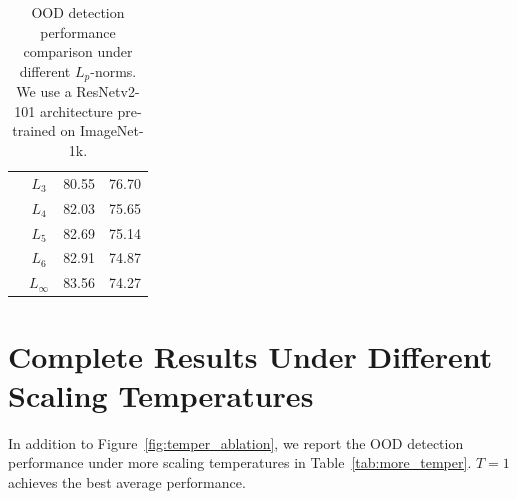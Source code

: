 \documentclass{article}
\begin{document}
\begin{table}[t]
\begin{tabular}{c|c|cc}
                                       & $L_{3}$                             & 80.55                & 76.70                \\
                                       & $L_{4}$                             & 82.03                & 75.65                \\
                                       & $L_{5}$                             & 82.69                & 75.14                \\
                                       & $L_{6}$                             & 82.91                & 74.87                \\
                                       & $L_{\infty}$                           & 83.56                & 74.27                \\ \bottomrule
\end{tabular}
    \caption{OOD detection performance comparison under different $L_p$-norms. We use a ResNetv2-101 architecture pre-trained on ImageNet-1k.}
    \label{tab:more_norm}
\end{table}


\clearpage
\section{Complete Results Under Different Scaling Temperatures}
\label{app:more_temper}

In addition to Figure~\ref{fig:temper_ablation}, we report the OOD detection performance under more scaling temperatures in Table~\ref{tab:more_temper}. $T=1$ achieves the best average performance.
\end{document}
